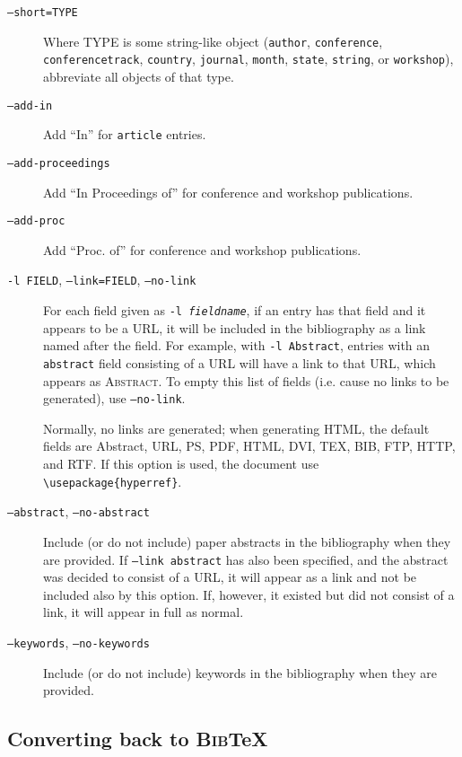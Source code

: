 \documentclass{article}
\newcommand{\BibTeX}{\textsc{Bib}\TeX}
\begin{document}
\begin{description}
\item[\texttt{--short=TYPE}]
Where TYPE is some string-like object (\texttt{author}, \texttt{conference}, \texttt{conferencetrack}, \texttt{country}, \texttt{journal}, \texttt{month}, \texttt{state}, \texttt{string}, or \texttt{workshop}), abbreviate all objects of that type.

\item[\texttt{--add-in}]
Add ``In'' for \texttt{article} entries.

\item[\texttt{--add-proceedings}]
Add ``In Proceedings of'' for conference and workshop publications.

\item[\texttt{--add-proc}]
Add ``Proc. of'' for conference and workshop publications.

\item[\texttt{-l FIELD}, \texttt{--link=FIELD}, \texttt{--no-link}]
For each field given as \texttt{-l \textrm{\textit{fieldname}}}, if an entry has that field and it appears to be a URL, it will be included in the bibliography as a link named after the field. For example, with \texttt{-l Abstract}, entries with an \texttt{abstract} field consisting of a URL will have a link to that URL, which appears as \textsc{Abstract}. To empty this list of fields (i.e. cause no links to be generated), use \texttt{--no-link}.

Normally, no links are generated; when generating HTML, the default fields are Abstract, URL, PS, PDF, HTML, DVI, TEX, BIB, FTP, HTTP, and RTF. If this option is used, the document use \texttt{\textbackslash{}usepackage\{hyperref\}}.

\item[\texttt{--abstract}, \texttt{--no-abstract}]
Include (or do not include) paper abstracts in the bibliography when they are provided. If \texttt{--link abstract} has also been specified, and the abstract was decided to consist of a URL, it will appear as a link and not be included also by this option. If, however, it existed but did not consist of a link, it will appear in full as normal.

\item[\texttt{--keywords}, \texttt{--no-keywords}]
Include (or do not include) keywords in the bibliography when they are provided.

\end{description}


\subsection{Converting back to \BibTeX{}}
\end{document}
